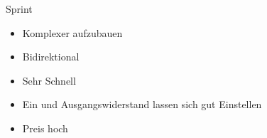 
\begin{frame}[c]{Sprint}

  \begin{itemize}
    \item Komplexer aufzubauen
    \item Bidirektional
    \item Sehr Schnell
    \item Ein und Ausgangswiderstand lassen sich gut Einstellen
    \item Preis hoch
  \end{itemize}

\end{frame}
